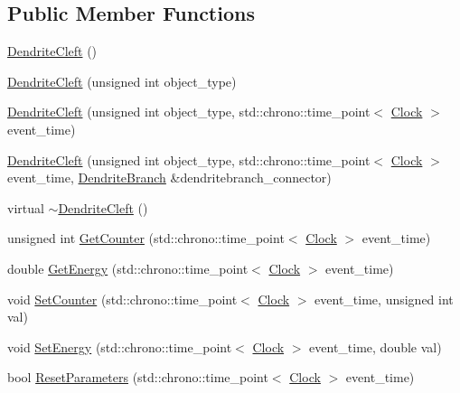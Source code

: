 \subsection*{Public Member Functions}
\begin{DoxyCompactItemize}
\item 
\mbox{\hyperlink{classDendriteCleft_a244a2e6377fafdf79df757d39a2684e5}{Dendrite\+Cleft}} ()
\item 
\mbox{\hyperlink{classDendriteCleft_a335660dfc63f55980b2dcf8849568086}{Dendrite\+Cleft}} (unsigned int object\+\_\+type)
\item 
\mbox{\hyperlink{classDendriteCleft_ad4070ce743d8302bc120ea948890ea37}{Dendrite\+Cleft}} (unsigned int object\+\_\+type, std\+::chrono\+::time\+\_\+point$<$ \mbox{\hyperlink{universe_8h_a0ef8d951d1ca5ab3cfaf7ab4c7a6fd80}{Clock}} $>$ event\+\_\+time)
\item 
\mbox{\hyperlink{classDendriteCleft_abcb81284cd9bd7ee2863eecfb6b59f62}{Dendrite\+Cleft}} (unsigned int object\+\_\+type, std\+::chrono\+::time\+\_\+point$<$ \mbox{\hyperlink{universe_8h_a0ef8d951d1ca5ab3cfaf7ab4c7a6fd80}{Clock}} $>$ event\+\_\+time, \mbox{\hyperlink{classDendriteBranch}{Dendrite\+Branch}} \&dendritebranch\+\_\+connector)
\item 
virtual \mbox{\hyperlink{classDendriteCleft_ad99958c45fa63f2f68b65d7e5ba45b32}{$\sim$\+Dendrite\+Cleft}} ()
\item 
unsigned int \mbox{\hyperlink{classDendriteCleft_ac567530d9f083e1ee65d5c6484cc9fa7}{Get\+Counter}} (std\+::chrono\+::time\+\_\+point$<$ \mbox{\hyperlink{universe_8h_a0ef8d951d1ca5ab3cfaf7ab4c7a6fd80}{Clock}} $>$ event\+\_\+time)
\item 
double \mbox{\hyperlink{classDendriteCleft_ad673df32db3982b3df745a55bf527834}{Get\+Energy}} (std\+::chrono\+::time\+\_\+point$<$ \mbox{\hyperlink{universe_8h_a0ef8d951d1ca5ab3cfaf7ab4c7a6fd80}{Clock}} $>$ event\+\_\+time)
\item 
void \mbox{\hyperlink{classDendriteCleft_a428b8e5117f381a382e0071b936d42a1}{Set\+Counter}} (std\+::chrono\+::time\+\_\+point$<$ \mbox{\hyperlink{universe_8h_a0ef8d951d1ca5ab3cfaf7ab4c7a6fd80}{Clock}} $>$ event\+\_\+time, unsigned int val)
\item 
void \mbox{\hyperlink{classDendriteCleft_a7e09ccb70936deabde9c12457cec949c}{Set\+Energy}} (std\+::chrono\+::time\+\_\+point$<$ \mbox{\hyperlink{universe_8h_a0ef8d951d1ca5ab3cfaf7ab4c7a6fd80}{Clock}} $>$ event\+\_\+time, double val)
\item 
bool \mbox{\hyperlink{classDendriteCleft_a3fee388d7023cfb460412e0322244ae2}{Reset\+Parameters}} (std\+::chrono\+::time\+\_\+point$<$ \mbox{\hyperlink{universe_8h_a0ef8d951d1ca5ab3cfaf7ab4c7a6fd80}{Clock}} $>$ event\+\_\+time)

\end{DoxyCompactItemize}
